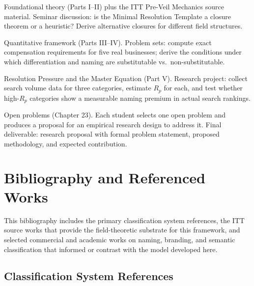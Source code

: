 \documentclass[12pt, openany]{book}
\theoremstyle{thmstyle}
\theoremstyle{defstyle}
\begin{document}
\begin{description}[leftmargin=0em]
\item[\textbf{Weeks 1--2}] Foundational theory (Parts I--II) plus the ITT Pre-Veil Mechanics source material. Seminar discussion: is the Minimal Resolution Template a closure theorem or a heuristic? Derive alternative closures for different field structures.

\item[\textbf{Weeks 3--4}] Quantitative framework (Parts III--IV). Problem sets: compute exact compensation requirements for five real businesses; derive the conditions under which differentiation and naming are substitutable vs.\ non-substitutable.

\item[\textbf{Weeks 5--6}] Resolution Pressure and the Master Equation (Part V). Research project: collect search volume data for three categories, estimate $R_p$ for each, and test whether high-$R_p$ categories show a measurable naming premium in actual search rankings.

\item[\textbf{Weeks 7--8}] Open problems (Chapter 23). Each student selects one open problem and produces a proposal for an empirical research design to address it. Final deliverable: research proposal with formal problem statement, proposed methodology, and expected contribution.
\end{description}

\chapter*{Bibliography and Referenced Works}

\begin{appbox}
This bibliography includes the primary classification system references, the ITT source works that provide the field-theoretic substrate for this framework, and selected commercial and academic works on naming, branding, and semantic classification that informed or contrast with the model developed here.
\end{appbox}

\section*{Classification System References}
\end{document}
